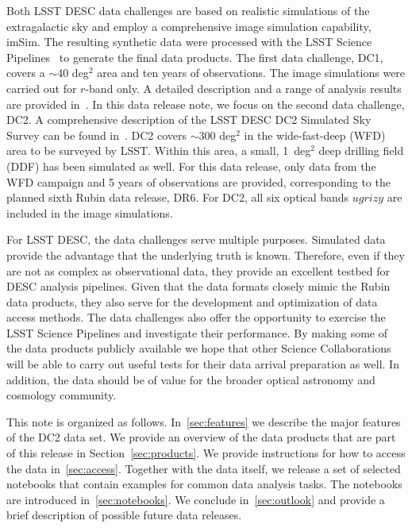 \documentclass[11pt]{report}
\begin{document}
Both LSST DESC data challenges are based on realistic simulations of the extragalactic sky and employ a comprehensive image simulation capability, imSim. The resulting synthetic data were processed with the LSST Science Pipelines~\citep{2017ASPC..512..279J} to generate the final data products. The first data challenge, DC1, covers a $\sim$40 deg$^2$ area and ten years of observations. The image simulations were carried out for $r$-band only. A detailed description and a range of analysis results are provided in~\cite{dc1}.  In this data release note, we focus on the second data challenge, DC2. A comprehensive description of the LSST DESC DC2 Simulated Sky Survey can be found in~\cite{2020arXiv201005926L}. DC2 covers $\sim$300 deg$^2$ in the wide-fast-deep (WFD) area to be surveyed by LSST. Within this area, a small, 1~deg$^2$ deep drilling field (DDF) has been simulated as well. For this data release, only data from the WFD campaign and 5 years of observations are provided, corresponding to the planned sixth Rubin data release, DR6. For DC2, all six optical bands $ugrizy$ are included in the image simulations.  

For LSST DESC, the data challenges serve multiple purposes. Simulated data provide the advantage that the underlying truth is known. Therefore, even if they are not as complex as observational data, they provide an excellent testbed for DESC analysis pipelines. Given that the data formats closely mimic the Rubin data products, they also serve for the development and optimization of data access methods. The data challenges also offer the opportunity to exercise the LSST Science Pipelines and investigate their performance.   By making some of the data products publicly available we hope that other Science Collaborations will be able to carry out useful tests for their data arrival preparation as well. In addition, the data should be of value for the broader optical astronomy and cosmology community.

This note is organized as follows. In~\autoref{sec:features} we describe the major features of the DC2 data set. We provide an overview of the data products that are part of this release in Section~\autoref{sec:products}. We provide instructions for how to access the data in~\autoref{sec:access}. Together with the data itself, we release a set of selected notebooks that contain examples for common data analysis tasks. The notebooks are introduced in~\autoref{sec:notebooks}.
We conclude in~\autoref{sec:outlook} and provide a brief description of possible future data releases. 
\end{document}
